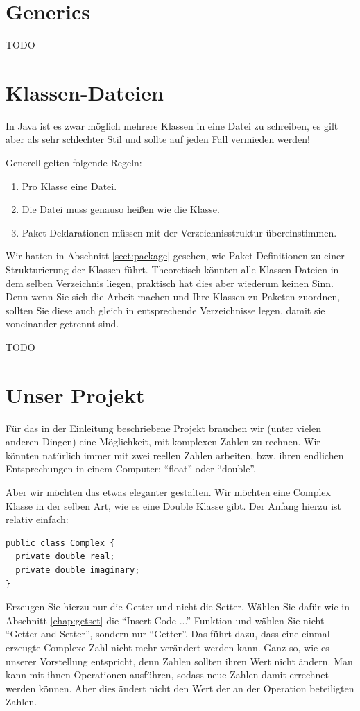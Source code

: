 \section{Generics}
TODO

\section{Klassen-Dateien}

In Java ist es zwar möglich mehrere Klassen in eine Datei zu schreiben, es gilt aber als sehr schlechter Stil und sollte auf jeden Fall vermieden werden!

Generell gelten folgende Regeln: 

\begin{enumerate}
\item Pro Klasse eine Datei. 
\item Die Datei muss genauso heißen wie die Klasse.
\item Paket Deklarationen müssen mit der Verzeichnisstruktur übereinstimmen.
\end{enumerate}

Wir hatten in Abschnitt \ref{sect:package} gesehen, wie Paket-Definitionen zu einer Strukturierung der Klassen führt. Theoretisch könnten alle Klassen Dateien in dem selben Verzeichnis liegen, praktisch hat dies aber wiederum keinen Sinn. Denn wenn Sie sich die Arbeit machen und Ihre Klassen zu Paketen zuordnen, sollten Sie diese auch gleich in entsprechende Verzeichnisse legen, damit sie voneinander getrennt sind. 

TODO

\section{Unser Projekt}

Für das in der Einleitung beschriebene Projekt brauchen wir (unter vielen anderen Dingen) eine Möglichkeit, mit komplexen Zahlen zu rechnen. Wir könnten natürlich immer mit zwei reellen Zahlen arbeiten, bzw. ihren endlichen Entsprechungen in einem Computer: "`float"' oder "`double"'. 

Aber wir möchten das etwas eleganter gestalten. Wir möchten eine Complex Klasse in der selben Art, wie es eine Double Klasse gibt. Der Anfang hierzu ist relativ einfach: 
\begin{lstlisting}
public class Complex {
  private double real;
  private double imaginary;
}
\end{lstlisting}
Erzeugen Sie hierzu nur die Getter und nicht die Setter. Wählen Sie dafür wie in Abschnitt \ref{chap:getset} die "`Insert Code ..."' Funktion und wählen Sie nicht "`Getter and Setter"', sondern nur "`Getter"'. Das führt dazu, dass eine einmal erzeugte Complexe Zahl nicht mehr verändert werden kann. Ganz so, wie es unserer Vorstellung entspricht, denn Zahlen sollten ihren Wert nicht ändern. Man kann mit ihnen Operationen ausführen, sodass neue Zahlen damit errechnet werden können. Aber dies ändert nicht den Wert der an der Operation beteiligten Zahlen. 

